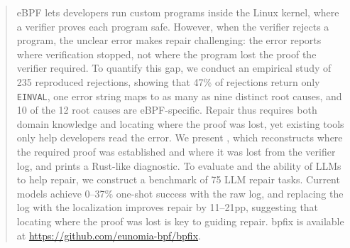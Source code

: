 \begin{abstract}
eBPF lets developers run custom programs inside the Linux kernel, where a verifier proves each program safe.
However, when the verifier rejects a program, the unclear error makes repair challenging: the error reports where verification stopped, not where the program lost the proof the verifier required.
To quantify this gap, we conduct an empirical study of 235 reproduced rejections, showing that 47\% of rejections return only \texttt{EINVAL}, one error string maps to as many as nine distinct root causes, and 10 of the 12 root causes are eBPF-specific. Repair thus requires both domain knowledge and locating where the proof was lost, yet existing tools only help developers read the error.
We present \sys, which reconstructs where the required proof was established and where it was lost from the verifier log, and prints a Rust-like diagnostic.
To evaluate \sys and the ability of LLMs to help repair, we construct a benchmark of 75 LLM repair tasks. Current models achieve 0--37\% one-shot success with the raw log, and replacing the log with the \sys localization improves repair by 11--21pp, suggesting that locating where the proof was lost is key to guiding repair.
bpfix is available at \url{https://github.com/eunomia-bpf/bpfix}.
\end{abstract}
